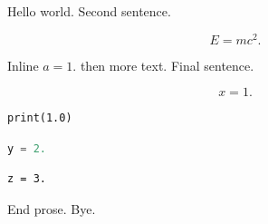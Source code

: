 \documentclass{article}
\begin{document}
Hello world. Second sentence.

\begin{equation}
E = mc^2.
\end{equation}

Inline $a = 1.$ then more text. Final sentence.

\[
x = 1.
\]

\begin{verbatim}
print(1.0)
\end{verbatim}

\begin{lstlisting}[language=Python]
y = 2.
\end{lstlisting}

\begin{verbatim}
z = 3.
\end{verbatim}

End prose. Bye.
\end{document}
